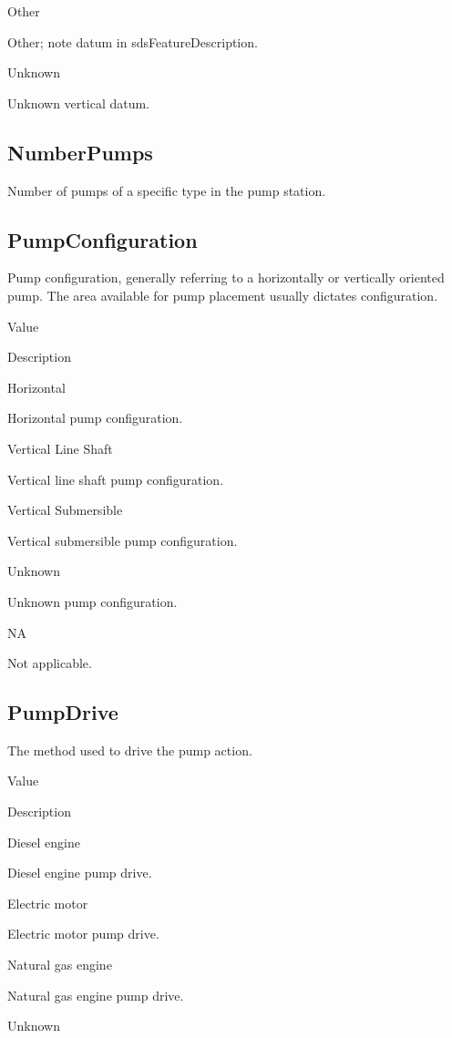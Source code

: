 \documentclass[
  letterpaper,
  DIV=11,
  numbers=noendperiod]{scrreprt}
\begin{document}
Other

Other; note datum in sdsFeatureDescription.

Unknown

Unknown vertical datum.

\subsection{NumberPumps}\label{numberpumps-1}

Number of pumps of a specific type in the pump station.

\subsection{PumpConfiguration}\label{pumpconfiguration-1}

Pump configuration, generally referring to a horizontally or vertically
oriented pump. The area available for pump placement usually dictates
configuration.

Value

Description

Horizontal

Horizontal pump configuration.

Vertical Line Shaft

Vertical line shaft pump configuration.

Vertical Submersible

Vertical submersible pump configuration.

Unknown

Unknown pump configuration.

NA

Not applicable.

\subsection{PumpDrive}\label{pumpdrive-1}

The method used to drive the pump action.

Value

Description

Diesel engine

Diesel engine pump drive.

Electric motor

Electric motor pump drive.

Natural gas engine

Natural gas engine pump drive.

Unknown
\end{document}
